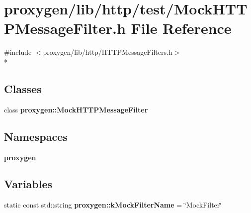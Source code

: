 \section{proxygen/lib/http/test/\+Mock\+H\+T\+T\+P\+Message\+Filter.h File Reference}
\label{MockHTTPMessageFilter_8h}
{\ttfamily \#include $<$proxygen/lib/http/\+H\+T\+T\+P\+Message\+Filters.\+h$>$}\\*
\subsection*{Classes}
\begin{DoxyCompactItemize}
\item 
class {\bf proxygen\+::\+Mock\+H\+T\+T\+P\+Message\+Filter}
\end{DoxyCompactItemize}
\subsection*{Namespaces}
\begin{DoxyCompactItemize}
\item 
 {\bf proxygen}
\end{DoxyCompactItemize}
\subsection*{Variables}
\begin{DoxyCompactItemize}
\item 
static const std\+::string {\bf proxygen\+::k\+Mock\+Filter\+Name} = \char`\"{}Mock\+Filter\char`\"{}
\end{DoxyCompactItemize}
